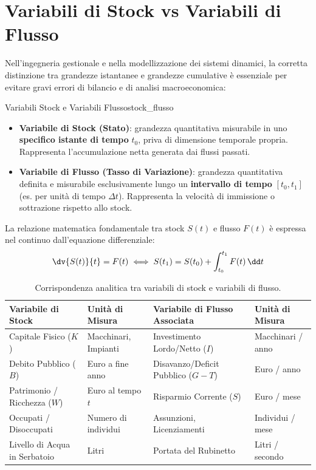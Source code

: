 \section{Variabili di Stock vs Variabili di Flusso}

Nell'ingegneria gestionale e nella modellizzazione dei sistemi dinamici, la corretta distinzione tra grandezze istantanee e grandezze cumulative è essenziale per evitare gravi errori di bilancio e di analisi macroeconomica:

\begin{definizione}{Variabili Stock e Variabili Flusso}{stock_flusso}
\begin{itemize}
    \item \textbf{Variabile di Stock (Stato)}: grandezza quantitativa misurabile in uno \textbf{specifico istante di tempo} $t_0$, priva di dimensione temporale propria. Rappresenta l'accumulazione netta generata dai flussi passati.
    \item \textbf{Variabile di Flusso (Tasso di Variazione)}: grandezza quantitativa definita e misurabile esclusivamente lungo un \textbf{intervallo di tempo} $[t_0, t_1]$ (es. per unità di tempo $\Delta t$). Rappresenta la velocità di immissione o sottrazione rispetto allo stock.
\end{itemize}
La relazione matematica fondamentale tra stock $S(t)$ e flusso $F(t)$ è espressa nel continuo dall'equazione differenziale:
\begin{equation}
    \dv{S(t)}{t} = F(t) \iff S(t_1) = S(t_0) + \int_{t_0}^{t_1} F(t) \, \dd t
\end{equation}
\end{definizione}

\begin{table}[htbp]
\centering
\small
\begin{tabularx}{\textwidth}{lXlX}
\toprule
\textbf{Variabile di Stock} & \textbf{Unità di Misura} & \textbf{Variabile di Flusso Associata} & \textbf{Unità di Misura} \\
\midrule
Capitale Fisico ($K$) & Macchinari, Impianti & Investimento Lordo/Netto ($I$) & Macchinari / anno \\
Debito Pubblico ($B$) & Euro a fine anno & Disavanzo/Deficit Pubblico ($G - T$) & Euro / anno \\
Patrimonio / Ricchezza ($W$) & Euro al tempo $t$ & Risparmio Corrente ($S$) & Euro / mese \\
Occupati / Disoccupati & Numero di individui & Assunzioni, Licenziamenti & Individui / mese \\
Livello di Acqua in Serbatoio & Litri & Portata del Rubinetto & Litri / secondo \\
\bottomrule
\end{tabularx}
\caption{Corrispondenza analitica tra variabili di stock e variabili di flusso.}
\label{tab:stock_flusso}
\end{table}

